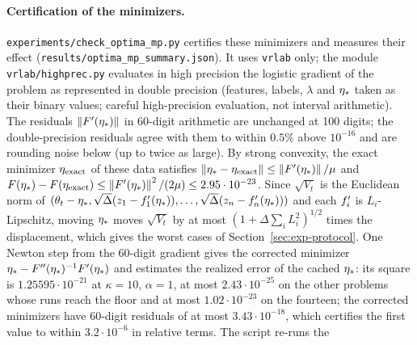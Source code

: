 \paragraph{Certification of the minimizers.}
\nolinkurl{experiments/check_optima_mp.py} certifies these minimizers and measures their effect
(\nolinkurl{results/optima_mp_summary.json}). It uses \nolinkurl{vrlab} only; the module \nolinkurl{vrlab/highprec.py}
evaluates in high precision the logistic gradient of the problem as represented in double precision (features, labels,
$\lambda$ and $\eta_\ast$ taken as their binary values; careful high-precision evaluation, not interval arithmetic). The
residuals $\left\|F'(\eta_\ast)\right\|$ in 60-digit arithmetic are unchanged at 100 digits; the double-precision residuals
agree with them to within $0.5\%$ above $10^{-16}$ and are rounding noise below (up to twice as large). By strong
convexity, the exact minimizer $\eta_{\rm exact}$ of these data satisfies
$\left\|\eta_\ast-\eta_{\rm exact}\right\|\le\left\|F'(\eta_\ast)\right\|/\mu$ and
$F(\eta_\ast)-F(\eta_{\rm exact})\le\left\|F'(\eta_\ast)\right\|^2/(2\mu)\le2.95\cdot10^{-23}$. Since $\sqrt{V_t}$ is the Euclidean
norm of $(\theta_t-\eta_\ast,\sqrt\Delta(z_1-f_1'(\eta_\ast)),\dots,\sqrt\Delta(z_n-f_n'(\eta_\ast)))$ and each $f'_i$ is
$L_i$-Lipschitz, moving $\eta_\ast$ moves $\sqrt{V_t}$ by at most $(1+\Delta\sum_iL_i^2)^{1/2}$ times the displacement,
which gives the worst cases of Section~\ref{sec:exp-protocol}. One Newton step from the 60-digit gradient gives the
corrected minimizer $\eta_\ast-F''(\eta_\ast)^{-1}F'(\eta_\ast)$ and estimates the realized error of the cached
$\eta_\ast$: its square is
$1.25595\cdot10^{-21}$ at $\kappa=10$, $\alpha=1$, at most $2.43\cdot10^{-25}$ on the other problems whose runs reach the
floor and at most $1.02\cdot10^{-23}$ on the fourteen; the corrected minimizers have 60-digit residuals of at most
$3.43\cdot10^{-18}$, which certifies the first value to within $3.2\cdot10^{-6}$ in relative terms. The script re-runs the
